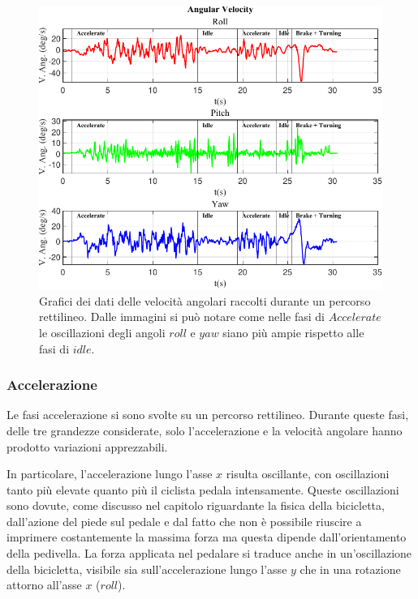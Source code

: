 \documentclass[class=article]{standalone}
\begin{document}
	
	\begin{center}
		\begin{figure}[h]
			\centering\includegraphics[width=.9\textwidth]{img/Vang LungaF.pdf}
			\caption[]{Grafici dei dati delle velocità angolari raccolti durante un percorso rettilineo. Dalle immagini si può notare come nelle fasi di \(Accelerate\) le oscillazioni degli angoli \(roll\) e \(yaw\) siano più ampie rispetto alle fasi di \(idle\).}
			\label{fig:VAngLunga}
		\end{figure}
	\end{center}
	
	\subsubsection{Accelerazione}
	Le fasi accelerazione si sono svolte su un percorso rettilineo. Durante queste fasi, delle tre grandezze considerate, solo l'accelerazione e la velocità angolare hanno prodotto variazioni apprezzabili.
	
	In particolare, l'accelerazione lungo l'asse \(x\) risulta oscillante, con oscillazioni tanto più elevate quanto più il ciclista pedala intensamente. Queste oscillazioni sono dovute, come discusso nel capitolo riguardante la fisica della bicicletta, dall'azione del piede sul pedale e dal fatto che non è possibile riuscire a imprimere costantemente la massima forza ma questa dipende dall'orientamento della pedivella. La forza applicata nel pedalare si traduce anche in un'oscillazione della bicicletta, visibile sia sull'accelerazione lungo l'asse \(y\) che in una rotazione attorno all'asse \(x\) (\(roll\)).
	
\end{document}
